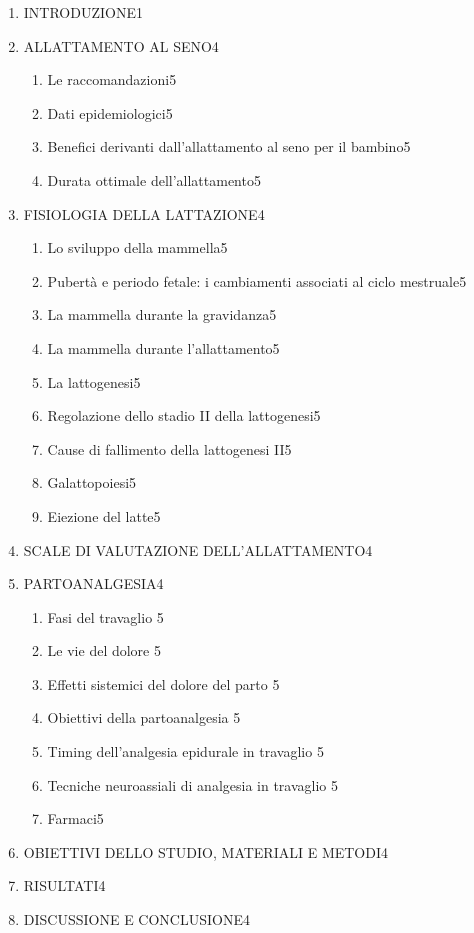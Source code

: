 \documentclass[]{article}
\begin{document}
\begin{enumerate}
\def\labelenumi{\arabic{enumi}.}
\item
  INTRODUZIONE1
\item
  ALLATTAMENTO AL SENO4

  \begin{enumerate}
  \def\labelenumii{\arabic{enumii}.}
  \item
    Le raccomandazioni5
  \item
    Dati epidemiologici5
  \item
    Benefici derivanti dall'allattamento al seno per il bambino5
  \item
    Durata ottimale dell'allattamento5
  \end{enumerate}
\item
  FISIOLOGIA DELLA LATTAZIONE4

  \begin{enumerate}
  \def\labelenumii{\arabic{enumii}.}
  \setcounter{enumii}{4}
  \item
    Lo sviluppo della mammella5
  \item
    Pubertà e periodo fetale: i cambiamenti associati al ciclo
    mestruale5
  \item
    La mammella durante la gravidanza5
  \item
    La mammella durante l'allattamento5
  \item
    La lattogenesi5
  \item
    Regolazione dello stadio II della lattogenesi5
  \item
    Cause di fallimento della lattogenesi II5
  \item
    Galattopoiesi5
  \item
    Eiezione del latte5
  \end{enumerate}
\item
  SCALE DI VALUTAZIONE DELL'ALLATTAMENTO4
\item
  PARTOANALGESIA4

  \begin{enumerate}
  \def\labelenumii{\arabic{enumii}.}
  \setcounter{enumii}{13}
  \item
    Fasi del travaglio 5
  \item
    Le vie del dolore 5
  \item
    Effetti sistemici del dolore del parto 5
  \item
    Obiettivi della partoanalgesia 5
  \item
    Timing dell'analgesia epidurale in travaglio 5
  \item
    Tecniche neuroassiali di analgesia in travaglio 5
  \item
    Farmaci5
  \end{enumerate}
\item
  OBIETTIVI DELLO STUDIO, MATERIALI E METODI4
\item
  RISULTATI4
\item
  DISCUSSIONE E CONCLUSIONE4


\end{enumerate}
\end{document}
